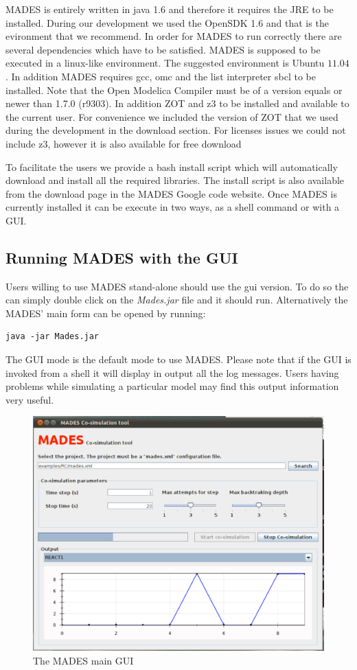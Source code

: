 \documentclass{kapproc} %
\begin{document}
MADES is entirely written in java 1.6 and therefore it requires the JRE to be installed. During our development we used the OpenSDK 1.6 and that is the evironment that we recommend.
In order for MADES to run correctly there are several dependencies which have to
be satisfied. MADES is supposed to be executed in a linux-like environment. 
The suggested environment is Ubuntu $11.04$. 
In addition MADES requires gcc, omc
and the list interpreter sbcl to be installed. Note that the Open Modelica Compiler must be of a version equals or newer than 1.7.0 (r9303). In addition ZOT and z3 to be installed
and available to the current user. For convenience we included the version 
of ZOT that we used during the development in the download 
section. For licenses issues we could not include z3,  however 
it is also available for free download~\cite{z3Website}

To facilitate the users we provide a bash install script which will automatically download and install all the required libraries. The install script is also available from the download page in the MADES Google code website.
Once MADES is currently installed it can be execute in two ways, as a shell 
command or with a GUI.

\subsection{Running MADES with the GUI}

Users willing to use MADES stand-alone should use the gui version. To do so the can simply double click on the \emph{Mades.jar} file and it should run. Alternatively the MADES' main form can be opened by running:\\
\begin{verbatim}
java -jar Mades.jar
\end{verbatim}

The GUI mode is the default mode to use MADES. Please note that if the GUI is invoked from a shell it will display in output all the log messages. Users having problems while simulating a particular model may find this output information very useful.

\begin{figure}[h]
	 \includegraphics[width=12cm]{img/Mades-gui.pdf}
	 \caption{The MADES main GUI}
	 \label{fig:mades-gui}
\end{figure}
\end{document}
